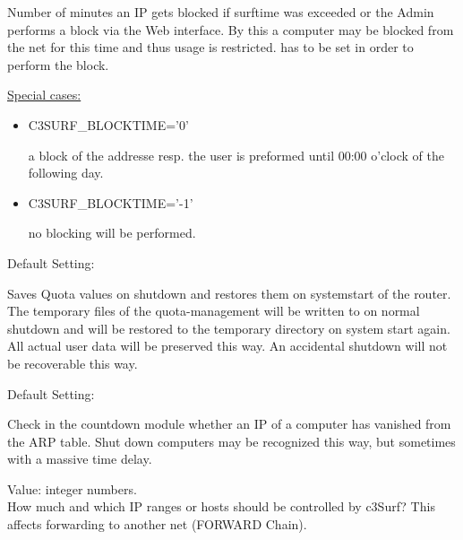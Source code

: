 \begin{itemize}
\begin{description}
  Number of minutes an IP gets blocked if surftime was exceeded or the Admin performs
  a block via the Web interface. By this a computer may be blocked from the net for this
  time and thus usage is restricted.  has to
  be set in order to perform the block.

\underline{Special cases:}\\
\begin{itemize}
  \item{C3SURF\_BLOCKTIME='0'}

	a block of the addresse resp. the user is preformed until 00:00 o'clock
	of the following day.
    \item{C3SURF\_BLOCKTIME='-1'}

	no blocking will be performed.
  \end{itemize}



  Default Setting: 

  Saves Quota values on shutdown and restores them on systemstart of the router.
  The temporary files of the quota-management will be written to
   on normal shutdown
  and will be restored to the temporary directory on system start again.
  All actual user data will be preserved this way. An accidental shutdown
  will not be recoverable this way.



  Default Setting: 

  Check in the countdown module whether an IP of a computer has vanished from the ARP table.
  Shut down computers may be recognized this way, but sometimes with a massive time delay.



  Value: integer numbers.\\
  How much and which IP ranges or hosts should be controlled by c3Surf?
  This affects forwarding to another net (FORWARD Chain).


\end{description}
\end{itemize}
